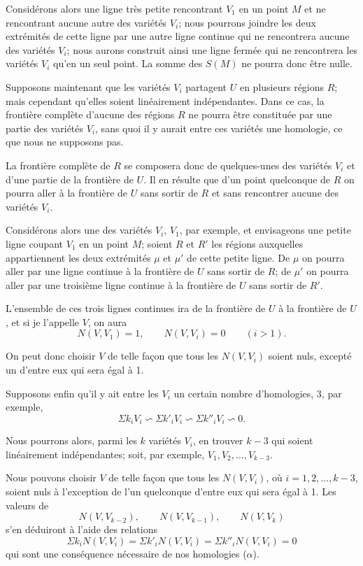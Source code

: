 \documentclass{article}
\begin{document}
Considérons alors une ligne très petite rencontrant $V_{1}$ en un point $M$ et ne rencontrant aucune autre des variétés $V_{i}$; nous pourrons joindre les deux extrémités de cette ligne par une autre ligne continue qui ne rencontrera aucune des variétés $V_{i}$; nous aurons construit ainsi une ligne fermée qui ne rencontrera les variétés $V_{i}$ qu'en un seul point. La somme des $S(M)$ ne pourra donc être nulle.

Supposons maintenant que les variétés $V_{i}$ partagent $U$ en plusieurs régions $R$; mais cependant qu'elles soient linéairement indépendantes. Dans ce cas, la frontière complète d'aucune des régions $R$ ne pourra être constituée par une partie des variétés $V_{i}$, sans quoi il y aurait entre ces variétés une homologie, ce que nous ne supposons pas.

La frontière complète de $R$ se composera donc de quelques-unes des
variétés $V_{i}$ et d'une partie de la frontière de $U$. Il en résulte que d'un point quelconque de $R$ on pourra aller à la frontière de $U$ sans sortir de $R$ et sans rencontrer aucune des variétés $V_{i}$.

Considérons alors une des variétés $V_{i}$, $V_{1}$, par exemple, et envisageons une petite ligne coupant $V_{1}$ en un point $M$; soient $R$ et $R'$ les régions auxquelles appartiennent les deux extrémités $\mu$ et $\mu'$ de cette petite ligne. De $\mu$ on pourra aller par une ligne continue à la frontière de $U$ sans sortir de $R$; de $\mu'$ on pourra aller par une troisième ligne continue à la frontière de $U$ sans sortir de $R'$.

L'ensemble de ces trois lignes continues ira de la frontière de $U$ à la frontière de $U$, et si je l'appelle $V$, on aura
\[
N(V, V_{1}) = 1, \qquad N(V, V_{i}) = 0 \qquad (i > 1).
\]

On peut donc choisir $V$ de telle façon que tous les $N(V, V_{i})$ soient nuls, excepté un d'entre eux qui sera égal à 1.

Supposons enfin qu'il y ait entre les $V_{i}$ un certain nombre d'homologies, 3, par exemple,
\[
\Sigma k_{i}V_{i} \backsim \Sigma k'_{i}V_{i} \backsim \Sigma k''_{i}V_{i} \backsim 0. \tag{$\alpha$}
\]

Nous pourrons alors, parmi les $k$ variétés $V_{i}$, en trouver $k-3$ qui soient linéairement indépendantes; soit, par exemple, $V_{1}, V_{2}, \ldots, V_{k-3}$.

Nous pouvons choisir $V$ de telle façon que tous les $N(V, V_{i})$, où $i = 1, 2, \ldots, k-3$, soient nuls à l'exception de l'un quelconque d'entre eux qui sera égal à 1. Les valeurs de
\[
N(V, V_{k-2}), \qquad N(V, V_{k-1}), \qquad N(V, V_{k})
\]
s'en déduiront à l'aide des relations
\[
\Sigma k_{i}N(V, V_{i}) = \Sigma k'_{i}N(V, V_{i}) = \Sigma k''_{i}N(V, V_{i}) = 0 \tag{$\beta$}
\]
qui sont une conséquence nécessaire de nos homologies ($\alpha$).
\end{document}
